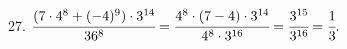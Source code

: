 27. $\cfrac{(7\cdot4^8+(-4)^9)\cdot3^{14}}{36^8}=\cfrac{4^8\cdot(7-4)\cdot3^{14}}{4^8\cdot3^{16}}=\cfrac{3^{15}}{3^{16}}=\cfrac{1}{3}.$\\

